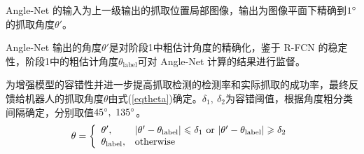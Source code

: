 \documentclass[no-math, withoutpreface]{YangThesis}
\begin{document}
Angle-Net 的输入为上一级输出的抓取位置局部图像，输出为图像平面下精确到$1^\circ$的抓取角度$\theta'$。

Angle-Net 输出的角度$\theta'$是对阶段1中粗估计角度的精确化，鉴于 R-FCN 的稳定性，阶段1中的粗估计角度$\theta_{\text{label}}$可对 Angle-Net 计算的结果进行监督。

为增强模型的容错性并进一步提高抓取检测的检测率和实际抓取的成功率，最终反馈给机器人的抓取角度$\theta$由式(\ref{eqtheta})确定。$\delta_1,\ \delta_2 $为容错阈值，根据角度粗分类间隔确定，分别取值$45^\circ,\ 135^\circ$。
\begin{equation}
\theta=
\left\{
\begin{array}{ll}
	\theta', & |\theta'-\theta_{\text{label}}|\ls\delta_1\ \text{or}\ 
	|\theta'-\theta_{\text{label}}|\gs\delta_2\\
	\theta_{\text{label}}, & \text{otherwise}
\end{array}
\right.
\label{eqtheta}
\end{equation}

%
%
\end{document}

